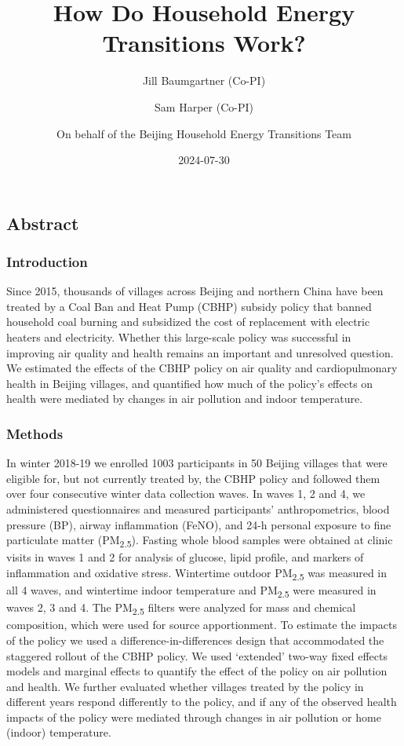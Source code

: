\documentclass[
  letterpaper,
  DIV=11,
  numbers=noendperiod]{scrartcl}
\title{How Do Household Energy Transitions Work?}
\author{Jill Baumgartner (Co-PI) \and Sam Harper (Co-PI) \and On behalf
of the Beijing Household Energy Transitions Team}
\date{2024-07-30}
\renewcommand*\contentsname{Table of contents}
\newcommand\contentsname{Table of contents}
\begin{document}
\maketitle

\renewcommand*\contentsname{Table of contents}
{
\hypersetup{linkcolor=}
\setcounter{tocdepth}{3}
\tableofcontents
}

\subsection*{Abstract}\label{abstract}

\subsubsection*{Introduction}\label{introduction}

Since 2015, thousands of villages across Beijing and northern China have
been treated by a Coal Ban and Heat Pump (CBHP) subsidy policy that
banned household coal burning and subsidized the cost of replacement
with electric heaters and electricity. Whether this large-scale policy
was successful in improving air quality and health remains an important
and unresolved question. We estimated the effects of the CBHP policy on
air quality and cardiopulmonary health in Beijing villages, and
quantified how much of the policy's effects on health were mediated by
changes in air pollution and indoor temperature.

\subsubsection*{Methods}\label{methods}

In winter 2018-19 we enrolled 1003 participants in 50 Beijing villages
that were eligible for, but not currently treated by, the CBHP policy
and followed them over four consecutive winter data collection waves. In
waves 1, 2 and 4, we administered questionnaires and measured
participants' anthropometrics, blood pressure (BP), airway inflammation
(FeNO), and 24-h personal exposure to fine particulate matter
(PM\textsubscript{2.5}). Fasting whole blood samples were obtained at
clinic visits in waves 1 and 2 for analysis of glucose, lipid profile,
and markers of inflammation and oxidative stress. Wintertime outdoor
PM\textsubscript{2.5} was measured in all 4 waves, and wintertime indoor
temperature and PM\textsubscript{2.5} were measured in waves 2, 3 and 4.
The PM\textsubscript{2.5} filters were analyzed for mass and chemical
composition, which were used for source apportionment. To estimate the
impacts of the policy we used a difference-in-differences design that
accommodated the staggered rollout of the CBHP policy. We used
`extended' two-way fixed effects models and marginal effects to quantify
the effect of the policy on air pollution and health. We further
evaluated whether villages treated by the policy in different years
respond differently to the policy, and if any of the observed health
impacts of the policy were mediated through changes in air pollution or
home (indoor) temperature.
\end{document}
